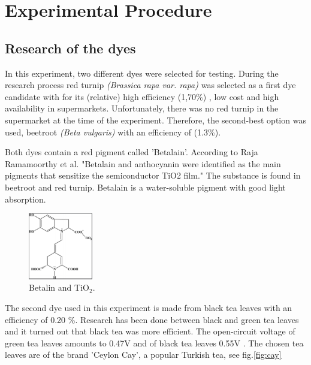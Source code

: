 \documentclass[conference]{IEEEtran}
\begin{document}
\section{Experimental Procedure}

\subsection{Research of the dyes} \label{ResearchDyes}
In this experiment, two different dyes were selected for testing. During the research process red turnip \textit{(Brassica rapa var. rapa)} was selected as a first dye candidate with for its (relative) high efficiency (1,70\%) \cite{redturnipeff}, low cost and high availability in supermarkets. Unfortunately, there was no red turnip in the supermarket at the time of the experiment. Therefore, the second-best option was used, beetroot \textit{(Beta vulgaris)} with an efficiency of (1.3\%). \cite{redbeeteff}

Both dyes contain a red pigment called 'Betalain'. According to Raja Ramamoorthy et al. \cite{betalinpicture} "Betalain and anthocyanin were identified as the
main pigments that sensitize the semiconductor TiO2 film." The substance is found in beetroot and red turnip. Betalain is a water-soluble pigment with good light absorption.\\

\begin{figure}[h]
\centering
\includegraphics[width=0.25\textwidth]{Betalin_TiO2.png}
\caption{Betalin and TiO$_2$. \cite{betalinpicture}}
\label{fig:Betalin_TiO2} %
\end{figure}

The second dye used in this experiment is made from black tea leaves with an efficiency of 0.20 \%. Research has been done between black and green tea leaves and it turned out that black tea was more efficient. The open-circuit voltage of green tea leaves amounts to 0.47V and of black tea leaves 0.55V \cite{blacktea} \cite{15naturaldyes}. The chosen tea leaves are of the brand 'Ceylon Cay', a popular Turkish tea, see fig.\ref{fig:cay}
\end{document}
